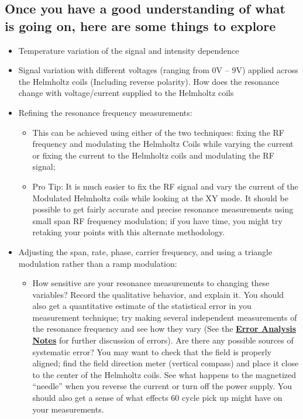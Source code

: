 \documentclass{../lab}
\begin{document}
\subsection{Once you have a good understanding of what is going on, here are some things to explore}

\begin{itemize}
    \item Temperature variation of the signal and intensity dependence

    \item Signal variation with different voltages (ranging from 0V -- 9V) applied across the Helmholtz coils (Including reverse polarity). How does the resonance change with voltage/current supplied to the Helmholtz coils

    \item Refining the resonance frequency measurements:
    \begin{itemize}
        \item This can be achieved using either of the two techniques: fixing the RF frequency and modulating the Helmholtz Coils while varying the current or fixing the current to the Helmholtz coils and modulating the RF signal;

        \item Pro Tip: It is much easier to fix the RF signal and vary the current of the Modulated Helmholtz coils while looking at the XY mode. It should be possible to get fairly accurate and precise resonance measurements using small span RF frequency modulation; if you have time, you might try retaking your points with this alternate methodology.
    \end{itemize}
    \item Adjusting the span, rate, phase, carrier frequency, and using a triangle modulation rather than a ramp modulation:
    \begin{itemize}
        \item How sensitive are your resonance measurements to changing these variables? Record the qualitative behavior, and explain it. You should also get a quantitative estimate of the statistical error in you measurement technique; try making several independent measurements of the resonance frequency and see how they vary (See the \href{\ErrorAnalysisNotes}{\textbf{Error Analysis Notes}} for further discussion of errors). Are there any possible sources of systematic error? You may want to check that the field is properly aligned; find the field direction meter (vertical compass) and place it close to the center of the Helmholtz coils. See what happens to the magnetized ``needle'' when you reverse the current or turn off the power supply. You should also get a sense of what effects 60 cycle pick up might have on your measurements.


\end{itemize}
\end{itemize}
\end{document}
